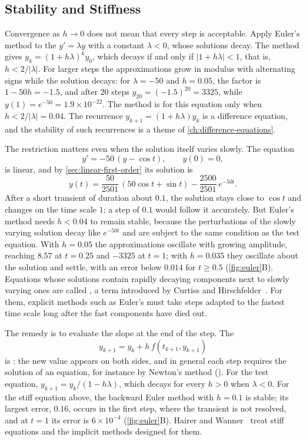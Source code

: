 \subsection{Stability and Stiffness}

Convergence as $h\to0$ does not mean that every step is acceptable. Apply Euler's method to the  $y'=\lambda y$ with a constant $\lambda<0$, whose solutions decay. The method gives $y_k=(1+h\lambda)^ky_0$, which decays if and only if $|1+h\lambda|<1$, that is, $h<2/|\lambda|$. For larger steps the approximations grow in modulus with alternating signs while the solution decays: for $\lambda=-50$ and $h=0.05$, the factor is $1-50h=-1.5$, and after $20$ steps $y_{20}=(-1.5)^{20}=3325$, while $y(1)=e^{-50}=1.9\times10^{-22}$. The method is  for this equation only when $h<2/|\lambda|=0.04$. The recurrence $y_{k+1}=(1+h\lambda)y_k$ is a difference equation, and the stability of such recurrences is a theme of \cref{ch:difference-equations}.

The restriction matters even when the solution itself varies slowly. The equation
\[
y'=-50\,(y-\cos t),\qquad y(0)=0 ,
\]
is linear, and by \cref{sec:linear-first-order} its solution is
\[
y(t)=\frac{50}{2501}\,(50\cos t+\sin t)-\frac{2500}{2501}\,e^{-50t} .
\]
After a short transient of duration about $0.1$, the solution stays close to $\cos t$ and changes on the time scale $1$; a step of $0.1$ would follow it accurately. But Euler's method needs $h<0.04$ to remain stable, because the perturbations of the slowly varying solution decay like $e^{-50t}$ and are subject to the same condition as the test equation. With $h=0.05$ the approximations oscillate with growing amplitude, reaching $8.57$ at $t=0.25$ and $-3325$ at $t=1$; with $h=0.035$ they oscillate about the solution and settle, with an error below $0.014$ for $t\ge0.5$ (\cref{fig:euler}B). Equations whose solutions contain rapidly decaying components next to slowly varying ones are called , a term introduced by Curtiss and Hirschfelder~\cite{curtiss1952}. For them, explicit methods such as Euler's must take steps adapted to the fastest time scale long after the fast components have died out.

The remedy is to evaluate the slope at the end of the step. The 
\[
y_{k+1}=y_k+h\,f(t_{k+1},y_{k+1})
\]
is : the new value appears on both sides, and in general each step requires the solution of an equation, for instance by Newton's method (). For the test equation, $y_{k+1}=y_k/(1-h\lambda)$, which decays for every $h>0$ when $\lambda<0$. For the stiff equation above, the backward Euler method with $h=0.1$ is stable; its largest error, $0.16$, occurs in the first step, where the transient is not resolved, and at $t=1$ its error is $6\times10^{-4}$ (\cref{fig:euler}B). Hairer and Wanner~\cite{hairer1996stiff} treat stiff equations and the implicit methods designed for them.

